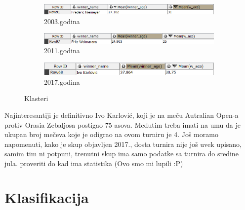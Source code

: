 \documentclass[a4paper]{article}
\begin{document}
\begin{figure}[H]
	\begin{subfigure}[h]{\textwidth}
		\begin{center}
			\includegraphics[scale=0.80]{Klasterovanje/FredericNiemeyer2003Outlier.png}
		\end{center}
		\caption{2003.godina}
		\label{fig:Autlajer2003}
	\end{subfigure}
	
	\vspace{0.5cm}
	\begin{subfigure}[h]{\textwidth}
		\begin{center}
			\includegraphics[scale=0.80]{Klasterovanje/FritzWolmarans2011Outlier.png}
		\end{center}
		\caption{2011.godina}
		\label{fig:Autlajer2011}
	\end{subfigure}
	
	\vspace{0.5cm}
	\begin{subfigure}[h]{\textwidth}
		\begin{center}
			\includegraphics[scale=0.80]{Klasterovanje/IvoKarlovic2017Outlier.png}
		\end{center}
		\caption{2017.godina}
		\label{fig:Autlajer2011}
	\end{subfigure}
	
	\caption{Klasteri}
	\label{fig:IgraciAutlajeri}
\end{figure} 

Najinteresantiji je definitivno Ivo Karlović, koji je na meču Autralian Open-a protiv Orasia Zebaljosa postigao 75 asova. Međutim treba imati na umu da je ukupan broj mečeva koje je odigrao na ovom turniru je 4. Još moramo napomenuti, kako je skup objavljen 2017., dosta turnira nije još uvek upisano, samim tim ni potpuni, trenutni skup ima samo podatke sa turnira do sredine jula. {\color{red} proveriti do kad ima statistika (Ovo smo mi lupili :P)}  


\section{Klasifikacija}
\end{document}
